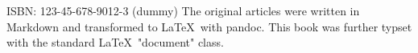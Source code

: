 \mbox{}
\vfill
ISBN: 123-45-678-9012-3 (dummy)
The original articles were written in Markdown
and transformed to \LaTeX\ with pandoc.
This book was further typset with the standard \LaTeX\ "document" class.
\doclicenseThis
